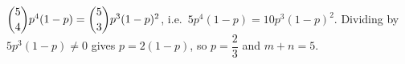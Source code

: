 \(\dbinom54p^4(1-p)=\dbinom53p^3(1-p)^2\), i.e.\ \(5p^4(1-p)=10p^3(1-p)^2\). Dividing by \(5p^3(1-p)\ne 0\) gives \(p=2(1-p)\), so \(p=\dfrac{2}{3}\) and \(m+n=\boxed{5}\).
